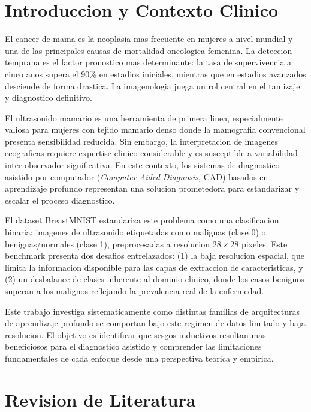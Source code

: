 \documentclass[12pt, a4paper]{article}
\begin{document}
\section{Introduccion y Contexto Clinico}

El cancer de mama es la neoplasia mas frecuente en mujeres a nivel mundial y una de las principales causas de mortalidad oncologica femenina. La deteccion temprana es el factor pronostico mas determinante: la tasa de supervivencia a cinco anos supera el 90\% en estadios iniciales, mientras que en estadios avanzados desciende de forma drastica. La imagenologia juega un rol central en el tamizaje y diagnostico definitivo.

El ultrasonido mamario es una herramienta de primera linea, especialmente valiosa para mujeres con tejido mamario denso donde la mamografia convencional presenta sensibilidad reducida. Sin embargo, la interpretacion de imagenes ecograficas requiere expertise clinico considerable y es susceptible a variabilidad inter-observador significativa. En este contexto, los sistemas de diagnostico asistido por computador (\textit{Computer-Aided Diagnosis}, CAD) basados en aprendizaje profundo representan una solucion prometedora para estandarizar y escalar el proceso diagnostico.

El dataset BreastMNIST \citep{yang2023medmnist} estandariza este problema como una clasificacion binaria: imagenes de ultrasonido etiquetadas como malignas (clase 0) o benignas/normales (clase 1), preprocesadas a resolucion $28\times28$ pixeles. Este benchmark presenta dos desafios entrelazados: (1) la baja resolucion espacial, que limita la informacion disponible para las capas de extraccion de caracteristicas, y (2) un desbalance de clases inherente al dominio clinico, donde los casos benignos superan a los malignos reflejando la prevalencia real de la enfermedad.

Este trabajo investiga sistematicamente como distintas familias de arquitecturas de aprendizaje profundo se comportan bajo este regimen de datos limitado y baja resolucion. El objetivo es identificar que sesgos inductivos resultan mas beneficiosos para el diagnostico asistido y comprender las limitaciones fundamentales de cada enfoque desde una perspectiva teorica y empirica.

\section{Revision de Literatura}
\end{document}

